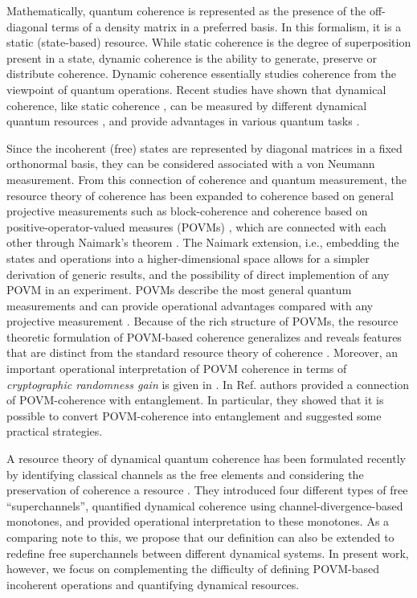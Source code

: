 \documentclass[american,aps,pra,reprint, superscriptaddress]{revtex4-1}
\theoremstyle{plain}
\theoremstyle{definition}
\theoremstyle{remark}
\begin{document}
Mathematically, quantum coherence is represented as the presence of the off-diagonal terms of a density matrix in a preferred basis.
In this formalism, it is a static (state-based) resource. While static coherence is the degree of superposition present in a state, dynamic coherence is the ability to generate, preserve or distribute coherence. Dynamic coherence essentially studies coherence from the viewpoint of quantum operations.
%
Recent studies have shown that dynamical coherence, like static coherence \cite{Streltsov4, Ma, Tan}, can be measured by different dynamical quantum resources \cite{Theurer}, and provide advantages in various quantum tasks \cite{Ducuara, Uola}.

Since the incoherent (free) states are represented by diagonal matrices in a fixed orthonormal basis, they can be considered associated with a von Neumann measurement. From this connection of coherence and quantum measurement, the resource theory of coherence has been expanded to coherence based on general projective measurements such as block-coherence \cite{Aberg} and coherence based on positive-operator-valued measures (POVMs) \cite{Bischof1, Bischof2}, which are connected with each other through Naimark's theorem \cite{Paulsen, Watrous}.
The Naimark extension, i.e., embedding the states and operations into a higher-dimensional space allows for a simpler derivation of generic results, and the possibility of direct implemention of any POVM in an experiment.
%
POVMs describe the most general quantum measurements and can provide operational advantages compared with any projective measurement \cite{Oszmaniec}.
Because of the rich structure of POVMs, the resource theoretic formulation of POVM-based coherence generalizes and reveals features that are distinct from the standard resource theory of coherence \cite{Bischof1, Bischof2}.
Moreover, an important operational interpretation of POVM coherence in terms of {\it cryptographic randomness gain} is given in \cite{Bischof2}.
In Ref. \cite{Kim-povm} authors provided a connection of POVM-coherence with entanglement. In particular, they showed that it is possible to convert POVM-coherence into entanglement and suggested some practical strategies.

A resource theory of dynamical quantum coherence has been formulated recently by identifying classical channels as the free elements and considering the preservation of coherence a resource \cite{Saxena}. They introduced four different types of free ``superchannels'', quantified dynamical coherence using channel-divergence-based monotones, and provided operational interpretation to these monotones. 
As a comparing note to this, we propose that our definition can also be extended to redefine free superchannels between different dynamical systems. In present work, however, we focus on complementing the difficulty of defining POVM-based incoherent operations and quantifying dynamical resources.
\end{document}

